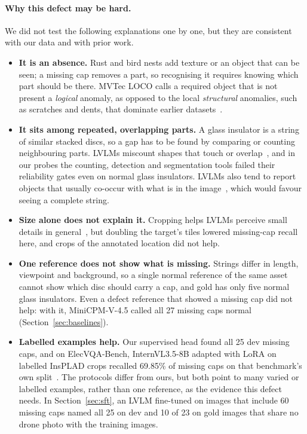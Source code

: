 \documentclass[11pt]{article}
\begin{document}
\paragraph{Why this defect may be hard.} We did not test the following explanations one by one, but they are consistent with our data and with prior work.
\begin{itemize}
  \item \textbf{It is an absence.} Rust and bird nests add texture or an object that can be seen; a missing cap removes a part, so recognising it requires knowing which part should be there. MVTec LOCO calls a required object that is not present a \emph{logical} anomaly, as opposed to the local \emph{structural} anomalies, such as scratches and dents, that dominate earlier datasets~\cite{bergmann2022loco}.
  \item \textbf{It sits among repeated, overlapping parts.} A glass insulator is a string of similar stacked discs, so a gap has to be found by comparing or counting neighbouring parts. LVLMs miscount shapes that touch or overlap~\cite{rahmanzadehgervi2024blind}, and in our probes the counting, detection and segmentation tools failed their reliability gates even on normal glass insulators. LVLMs also tend to report objects that usually co-occur with what is in the image~\cite{li2023pope}, which would favour seeing a complete string.
  \item \textbf{Size alone does not explain it.} Cropping helps LVLMs perceive small details in general~\cite{zhang2025mllmsknow}, but doubling the target's tiles lowered missing-cap recall here, and crops of the annotated location did not help.
  \item \textbf{One reference does not show what is missing.} Strings differ in length, viewpoint and background, so a single normal reference of the same asset cannot show which disc should carry a cap, and gold has only five normal glass insulators. Even a defect reference that showed a missing cap did not help: with it, MiniCPM-V-4.5 called all 27 missing caps normal (Section~\ref{sec:baselines}).
  \item \textbf{Labelled examples help.} Our supervised head found all 25 dev missing caps, and on ElecVQA-Bench, InternVL3.5-8B adapted with LoRA on labelled InsPLAD crops recalled 69.85\% of missing caps on that benchmark's own split~\cite{zhang2026elecvqa}. The protocols differ from ours, but both point to many varied or labelled examples, rather than one reference, as the evidence this defect needs. In Section~\ref{sec:sft}, an LVLM fine-tuned on images that include 60 missing caps named all 25 on dev and 10 of 23 on gold images that share no drone photo with the training images.
\end{itemize}
\end{document}

